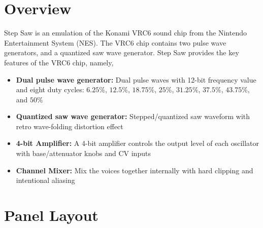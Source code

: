 \documentclass[12pt,letter]{article}
\begin{document}


\section{Overview}

Step Saw is an emulation of the Konami VRC6 sound chip from the Nintendo Entertainment System (NES). The VRC6 chip contains two pulse wave generators, and a quantized saw wave generator. Step Saw provides the key features of the VRC6 chip, namely,
\begin{itemize}
  \item \textbf{Dual pulse wave generator:} Dual pulse waves with 12-bit frequency value and eight duty cycles: $6.25\%$, $12.5\%$, $18.75\%$, $25\%$, $31.25\%$, $37.5\%$, $43.75\%$, and $50\%$
  \item \textbf{Quantized saw wave generator:} Stepped/quantized saw waveform with retro wave-folding distortion effect
  \item \textbf{4-bit Amplifier:} A 4-bit amplifier controls the output level of each oscillator with base/attenuator knobs and CV inputs
  \item \textbf{Channel Mixer:} Mix the voices together internally with hard clipping and intentional aliasing
\end{itemize}


\clearpage
\section{Panel Layout}
\end{document}
